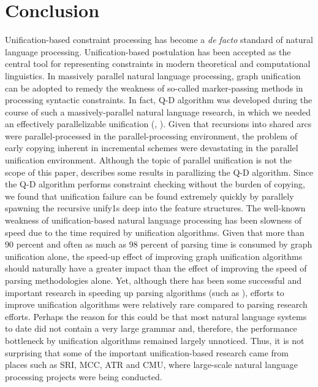 \section{Conclusion}

Unification-based constraint processing has become a {\it de
facto} standard of natural language processing. 
Unification-based postulation has been accepted as the
central tool for representing constraints in modern
theoretical and computational linguistics. In massively
parallel natural language processing, graph unification can
be adopted to remedy the weakness of so-called
marker-passing methods in processing syntactic constraints. 
In fact, Q-D algorithm was developed during the course of
such a massively-parallel natural language research, in
which we needed an effectively parallelizable unification
(\cite{cogsci91}, \cite{MONA-LISA}).  Given that recursions
into shared arcs were parallel-processed in the
parallel-processing environment, the problem of early
copying inherent in incremental schemes were devastating in
the parallel unification environment. Although the topic of
parallel unification is not the scope of this paper,
\cite{pquasi} describes some results in parallizing the Q-D
algorithm. Since the Q-D algorithm performs constraint
checking without the burden of copying, we found that
unification failure can be found extremely quickly by
parallely spawning the recursive unify1s deep into the
feature structures.  The well-known weakness of
unification-based natural language processing has been
slowness of speed due to the time required by unification
algorithms.  Given that more than 90 percent and often as
much as 98 percent of parsing time is consumed by graph
unification alone, the speed-up effect of improving graph
unification algorithms should naturally have a greater
impact than the effect of improving the speed of parsing
methodologies alone. Yet, although there has been some
successful and important research in speeding up parsing
algorithms (such as \cite{Tomita}), efforts to improve
unification algorithms were relatively rare compared to
parsing research efforts.  Perhaps the reason for this could
be that most natural language systems to date did not
contain a very large grammar and, therefore, the performance
bottleneck by unification algorithms remained largely
unnoticed.  Thus, it is not surprising that some of the
important unification-based research came from places such
as SRI, MCC, ATR and CMU, where large-scale natural language
processing projects were being conducted. 

